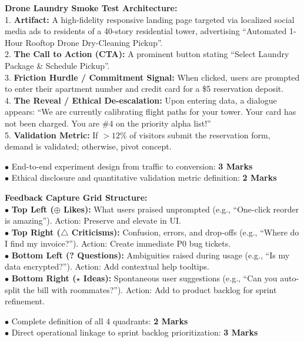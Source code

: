 \begin{solutionbox}
\textbf{Drone Laundry Smoke Test Architecture:}\\
1. \textbf{Artifact:} A high-fidelity responsive landing page targeted via localized social media ads to residents of a 40-story residential tower, advertising ``Automated 1-Hour Rooftop Drone Dry-Cleaning Pickup''.\\
2. \textbf{The Call to Action (CTA):} A prominent button stating ``Select Laundry Package \& Schedule Pickup''.\\
3. \textbf{Friction Hurdle / Commitment Signal:} When clicked, users are prompted to enter their apartment number and credit card for a \$5 reservation deposit.\\
4. \textbf{The Reveal / Ethical De-escalation:} Upon entering data, a dialogue appears: ``We are currently calibrating flight paths for your tower. Your card has not been charged. You are \#4 on the priority alpha list!''\\
5. \textbf{Validation Metric:} If $>12\%$ of visitors submit the reservation form, demand is validated; otherwise, pivot concept.
\begin{markingrubric}
$\bullet$ End-to-end experiment design from traffic to conversion: \textbf{3 Marks}\\
$\bullet$ Ethical disclosure and quantitative validation metric definition: \textbf{2 Marks}
\end{markingrubric}
\end{solutionbox}

\begin{solutionbox}
\textbf{Feedback Capture Grid Structure:}\\
$\bullet$ \textbf{Top Left ($\oplus$ Likes):} What users praised unprompted (e.g., ``One-click reorder is amazing''). Action: Preserve and elevate in UI.\\
$\bullet$ \textbf{Top Right ($\triangle$ Criticisms):} Confusion, errors, and drop-offs (e.g., ``Where do I find my invoice?''). Action: Create immediate P0 bug tickets.\\
$\bullet$ \textbf{Bottom Left (? Questions):} Ambiguities raised during usage (e.g., ``Is my data encrypted?''). Action: Add contextual help tooltips.\\
$\bullet$ \textbf{Bottom Right ($\star$ Ideas):} Spontaneous user suggestions (e.g., ``Can you auto-split the bill with roommates?''). Action: Add to product backlog for sprint refinement.
\begin{markingrubric}
$\bullet$ Complete definition of all 4 quadrants: \textbf{2 Marks}\\
$\bullet$ Direct operational linkage to sprint backlog prioritization: \textbf{3 Marks}
\end{markingrubric}
\end{solutionbox}

